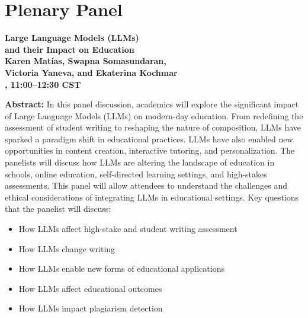\newpage
{}
\section{Plenary Panel}

\begin{center}
{\bfseries\Large Large Language Models (LLMs)\\\vspace{2.0\lineskip}and their Impact on Education} \\
\vspace{1.0em}
{\large\bf Karen Matías, Swapna Somasundaran,\\\vspace{2.0\lineskip}Victoria Yaneva, and Ekaterina Kochmar} \\

\textbf{\daydateyear{}, 11:00--12:30 CST}\\
\textbf{\PlenaryLoc{}}
\end{center}

\noindent
{\bfseries Abstract:}
In this panel discussion, academics will explore the significant impact of Large Language Models (LLMs) on modern-day education. From redefining the assessment of student writing to reshaping the nature of composition, LLMs have sparked a paradigm shift in educational practices. LLMs have also enabled new opportunities in content creation, interactive tutoring, and personalization. The panelists will discuss how LLMs are altering the landscape of education in schools, online education, self-directed learning settings, and high-stakes assessments. This panel will allow attendees to understand the challenges and ethical considerations of integrating LLMs in educational settings. Key questions that the panelist will discuss:
\begin{itemize}
\item How LLMs affect high-stake and student writing assessment
\item How LLMs change writing
\item How LLMs enable new forms of educational applications
\item How LLMs affect educational outcomes
\item How LLMs impact plagiarism detection
\end{itemize}



